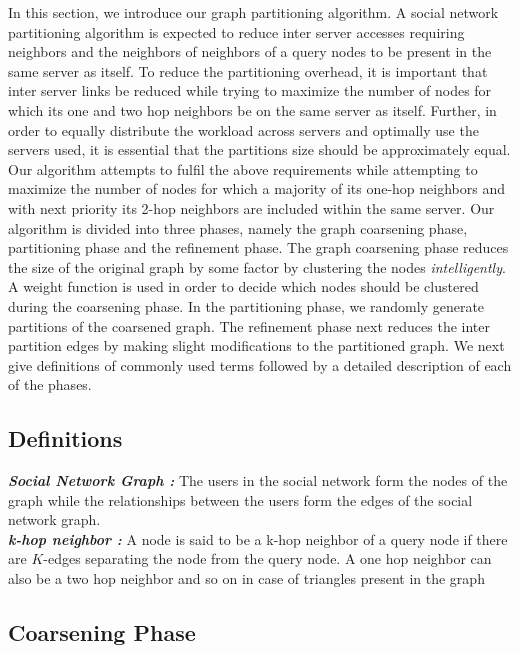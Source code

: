 \documentclass[letterpaper]{article}
\begin{document}
In this section, we introduce our graph partitioning algorithm. A social
network  partitioning algorithm is expected to reduce inter server accesses
requiring neighbors and the neighbors of neighbors of a query nodes to be
present in the same server as itself.  To reduce the partitioning overhead, it
is important that inter server links be reduced while trying to maximize the
number of nodes for which its one and two hop neighbors be on the same server
as itself.  Further, in order to equally distribute the workload across servers
and optimally use the servers used, it is essential that the partitions size
should be approximately equal. Our algorithm attempts to fulfil the above
requirements while attempting to maximize the number of nodes for which a
majority of its one-hop neighbors and with next priority its 2-hop neighbors
are included within the same server.  Our algorithm is divided into three
phases, namely the graph coarsening phase, partitioning phase and the
refinement phase. The graph coarsening phase reduces the size of the original
graph by some factor by clustering the nodes \emph{intelligently}.  A weight
function is used in order to decide which nodes should be clustered  during the
coarsening phase. In the partitioning phase, we randomly generate partitions of
the coarsened graph. The refinement phase next reduces the inter partition
edges by making slight modifications to the partitioned graph. We next give
definitions of commonly used terms followed by a detailed description of each
of the phases.



\subsection{Definitions}
\textbf {\it{Social Network Graph :} }The users in the social network form the
nodes of the graph while the relationships between the users form the edges of
the social network graph.\\ \textbf{\it{k-hop neighbor :}} A node is said to be
a k-hop neighbor of a query node if there are  $K$-edges separating the node
from the query node. A one hop neighbor can also be a two hop neighbor and so
on in case of triangles present in the graph

\subsection{Coarsening Phase}
\end{document}
